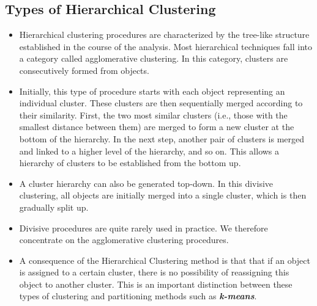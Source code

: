 \subsection{Types of Hierarchical Clustering}
\begin{itemize}
\item
Hierarchical clustering procedures are characterized by the tree-like structure
established in the course of the analysis. Most hierarchical techniques fall into a
category called agglomerative clustering. In this category, clusters are consecutively
formed from objects. 
\item Initially, this type of procedure starts with each object
representing an individual cluster. These clusters are then sequentially merged
according to their similarity. First, the two most similar clusters (i.e., those with
the smallest distance between them) are merged to form a new cluster at the bottom
of the hierarchy. In the next step, another pair of clusters is merged and linked to a
higher level of the hierarchy, and so on. This allows a hierarchy of clusters to be
established from the bottom up.
\item A cluster hierarchy can also be generated top-down. In this divisive clustering,
all objects are initially merged into a single cluster, which is then gradually split up. 
\item Divisive procedures are quite rarely used in practice. We therefore
concentrate on the agglomerative clustering procedures.
\item A consequence of the Hierarchical Clustering method is that that if an object is assigned
to a certain cluster, there is no possibility of reassigning this object to another
cluster. This is an important distinction between these types of clustering and
partitioning methods such as \textbf{\textit{k-means}}.
\end{itemize}

\newpage
